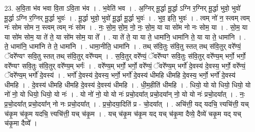 \documentclass[17pt]{extarticle}
\begin{document}
23. अ॒वि॒ता भ॑व भवा वि॒ता ऽवि॒ता भ॑व । . भ॒वेति॑ भव । . अ॒ग्निर् मू॒र्द्धा मू॒र्द्धा ऽग्नि र॒ग्निर् मू॒र्द्धा भुवो॒ भुवो॑ मू॒र्द्धा ऽग्नि र॒ग्निर् मू॒र्द्धा भुवः॑ । . मू॒र्द्धा भुवो॒ भुवो॑ मू॒र्द्धा मू॒र्द्धा भुवः॑ । . भुव॒ इति॒ भुवः॑ । . त्वम् नो॑ न॒ स्त्वम् त्वम् नः॑ सोम सोम न॒ स्त्वम् त्वम् नः॑ सोम । . नः॒ सो॒म॒ सो॒म॒ नो॒ नः॒ सो॒म॒ या या सो॑म नो नः सोम॒ या । . सो॒म॒ या या सो॑म सोम॒ या ते॑ ते॒ या सो॑म सोम॒ या ते᳚ । . या ते॑ ते॒ या या ते॒ धामा॑नि॒ धामा॑नि ते॒ या या ते॒ धामा॑नि । . ते॒ धामा॑नि॒ धामा॑नि ते ते॒ धामा॑नि । . धामा॒नीति॒ धामा॑नि । . तथ् स॑वि॒तुः स॑वि॒तु स्तत् तथ् स॑वि॒तुर् वरे᳚ण्यं॒ ॅवरे᳚ण्यꣳ सवि॒तु स्तत् तथ् स॑वि॒तुर् वरे᳚ण्यम् । . स॒वि॒तुर् वरे᳚ण्यं॒ ॅवरे᳚ण्यꣳ सवि॒तुः स॑वि॒तुर् वरे᳚ण्य॒म् भर्गो॒ भर्गो॒ वरे᳚ण्यꣳ सवि॒तुः स॑वि॒तुर् वरे᳚ण्य॒म् भर्गः॑ । . वरे᳚ण्य॒म् भर्गो॒ भर्गो॒ वरे᳚ण्यं॒ ॅवरे᳚ण्य॒म् भर्गो॑ दे॒वस्य॑ दे॒वस्य॒ भर्गो॒ वरे᳚ण्यं॒ ॅवरे᳚ण्य॒म् भर्गो॑ दे॒वस्य॑ । . भर्गो॑ दे॒वस्य॑ दे॒वस्य॒ भर्गो॒ भर्गो॑ दे॒वस्य॑ धीमहि धीमहि दे॒वस्य॒ भर्गो॒ भर्गो॑ दे॒वस्य॑ धीमहि । . दे॒वस्य॑ धीमहि धीमहि दे॒वस्य॑ दे॒वस्य॑ धीमहि । . धी॒म॒हीति॑ धीमहि । . धियो॒ यो यो धियो॒ धियो॒ यो नो॑ नो॒ यो धियो॒ धियो॒ यो नः॑ । . यो नो॑ नो॒ यो यो नः॑ प्रचो॒दया᳚त् प्रचो॒दया᳚न् नो॒ यो यो नः॑ प्रचो॒दया᳚त् । . नः॒ प्र॒चो॒दया᳚त् प्रचो॒दया᳚न् नो नः प्रचो॒दया᳚त् । . प्र॒चो॒दया॒दिति॑ प्र - चो॒दया᳚त् । . अचि॑त्ती॒ यद् यदचि॒ त्त्यचि॑त्ती॒ यच् च॑कृ॒म च॑कृ॒म यदचि॒ त्त्यचि॑त्ती॒ यच् च॑कृ॒म । . यच् च॑कृ॒म च॑कृ॒म यद् यच् च॑कृ॒मा दैव्ये॒ दैव्ये॑ चकृ॒म यद् यच् च॑कृ॒मा दैव्ये᳚ । \newline
\end{document}
